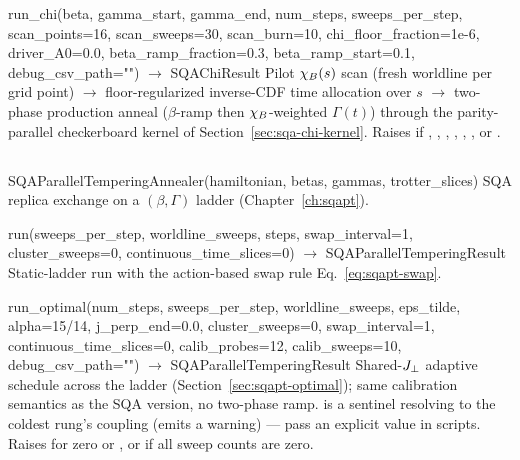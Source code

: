 \begin{apibox}{run\_chi(beta, gamma\_start, gamma\_end, num\_steps,
sweeps\_per\_step, scan\_points=16, scan\_sweeps=30, scan\_burn=10,
chi\_floor\_fraction=1e-6, driver\_A0=0.0, beta\_ramp\_fraction=0.3,
beta\_ramp\_start=0.1, debug\_csv\_path="") $\rightarrow$ SQAChiResult}
Pilot $\chi_B(s)$ scan (fresh worldline per grid point) $\to$
floor-regularized inverse-CDF time allocation over $s$ $\to$ two-phase
production anneal ($\beta$-ramp then $\chi_B$-weighted $\Gamma(t)$) through
the parity-parallel checkerboard kernel of Section~\ref{sec:sqa-chi-kernel}.
Raises  if ,
, ,
, ,
, or .
\end{apibox}

\subsection{}

\begin{apibox}{SQAParallelTemperingAnnealer(hamiltonian, betas, gammas,
trotter\_slices)}
SQA replica exchange on a $(\beta,\Gamma)$ ladder
(Chapter~\ref{ch:sqapt}).
\end{apibox}

\begin{apibox}{run(sweeps\_per\_step, worldline\_sweeps, steps,
swap\_interval=1, cluster\_sweeps=0, continuous\_time\_slices=0)
$\rightarrow$ SQAParallelTemperingResult}
Static-ladder run with the action-based swap rule
Eq.~\eqref{eq:sqapt-swap}.
\end{apibox}

\begin{apibox}{run\_optimal(num\_steps, sweeps\_per\_step, worldline\_sweeps,
eps\_tilde, alpha=15/14, j\_perp\_end=0.0, cluster\_sweeps=0,
swap\_interval=1, continuous\_time\_slices=0, calib\_probes=12,
calib\_sweeps=10, debug\_csv\_path="") $\rightarrow$
SQAParallelTemperingResult}
Shared-$J_{\perp}$ adaptive schedule across the ladder
(Section~\ref{sec:sqapt-optimal}); same calibration semantics as the SQA
version, no two-phase ramp.  is a sentinel resolving
to the coldest rung's coupling (emits a warning) --- pass an explicit value
in scripts. Raises  for zero  or
, or if all sweep counts are zero.
\end{apibox}

